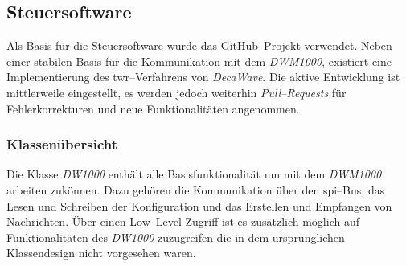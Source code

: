 \begin{comment}
------------------------------------------------------------------------------------------
- Woher kommt die Steuersoftware und wer ist für diese Zustandig?
	- Aktive Entwicklung wurde eingestellt
	- Was kann ich mit dieser Software machen?
\end{comment}
\subsection{Steuersoftware}

Als Basis für die Steuersoftware wurde das GitHub--Projekt \cite{Trojer2015} verwendet. Neben einer stabilen Basis für die Kommunikation mit dem \textit{DWM1000}, existiert eine Implementierung des \Gls{twr}--Verfahrens von \textit{DecaWave}. Die aktive Entwicklung ist mittlerweile eingestellt, es werden jedoch weiterhin \textit{Pull--Requests\footnotemark} für Fehlerkorrekturen und neue Funktionalitäten angenommen.



\begin{comment}
------------------------------------------------------------------------------------------
- Klassendiagramme der wichtigsten Elemente
	- Auswelchen wichtigen Elementen besteht diese Bibliothek?
	- DW1000
	- DW1000Time
	- DW1000Device
	- DW1000Ranging
- Die Steuersoftware besteht aus den Klassen \textit{DW1000}, \textit{DW1000Time}, \textit{DW1000Ranging}, \textit{DW1000Device} die im folgenden Beschrieben werden.
\end{comment}
\subsubsection{Klassenübersicht}

Die Klasse \textit{DW1000} enthält alle Basisfunktionalität um mit dem \textit{DWM1000} arbeiten zukönnen. Dazu gehören die Kommunikation über den \Gls{spi}--Bus, das Lesen und Schreiben der Konfiguration und das Erstellen und Empfangen von Nachrichten. Über einen Low--Level Zugriff ist es zusätzlich möglich auf Funktionalitäten des \textit{DW1000} zuzugreifen die in dem ursprunglichen Klassendesign nicht vorgesehen waren.

